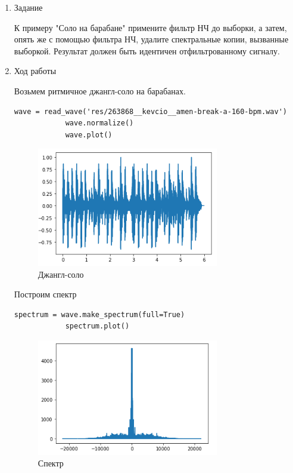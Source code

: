 \documentclass[a4paper,12pt]{article}
\begin{document}
	\begin{enumerate}
		
		\item{Задание}
		
		К примеру "Соло на барабане" примените фильтр НЧ до выборки, а затем, опять же с помощью фильтра НЧ, удалите спектральные копии, вызванные выборкой. Результат должен быть идентичен отфильтрованному сигналу.
		
		\item{Ход работы}
		
		Возьмем ритмичное джангл-соло на барабанах.
		\begin{lstlisting}[caption=Джангл-соло]
			wave = read_wave('res/263868__kevcio__amen-break-a-160-bpm.wav')
			wave.normalize()
			wave.plot()
		\end{lstlisting}
		\begin{figure}[H]
			\centering
			\includegraphics[width=0.75\textwidth]{3_1.png}
			\caption{Джангл-соло}
			\label{fig:3.1}
		\end{figure}
		
		Построим спектр
		\begin{lstlisting}[caption=Спектр]
			spectrum = wave.make_spectrum(full=True)
			spectrum.plot()
		\end{lstlisting}
		\begin{figure}[H]
			\centering
			\includegraphics[width=0.75\textwidth]{3_2.png}
			\caption{Спектр}
			\label{fig:3.2}
		\end{figure}
		

\end{enumerate}
\end{document}
